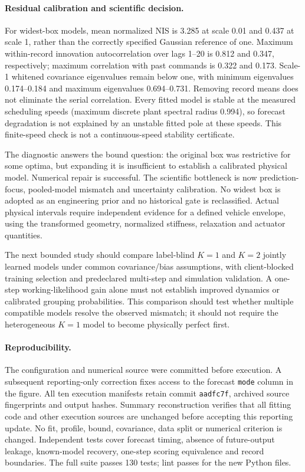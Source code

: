 \paragraph{Residual calibration and scientific decision.}
For widest-box models, mean normalized NIS is 3.285 at scale 0.01 and 0.437
at scale 1, rather than the correctly specified Gaussian reference of one.
Maximum within-record innovation autocorrelation over lags 1--20 is 0.812
and 0.347, respectively; maximum correlation with past commands is 0.322 and
0.173. Scale-1 whitened covariance eigenvalues remain below one, with minimum
eigenvalues 0.174--0.184 and maximum eigenvalues 0.694--0.731. Removing record
means does not eliminate the serial correlation. Every fitted model is stable
at the measured scheduling speeds (maximum discrete plant spectral radius
0.994), so forecast degradation is not explained by an unstable fitted pole
at these speeds. This finite-speed check is not a continuous-speed stability
certificate.

The diagnostic answers the bound question: the original box was restrictive
for some optima, but expanding it is insufficient to establish a calibrated
physical model. Numerical repair is successful. The scientific bottleneck
is now prediction-focus, pooled-model mismatch and uncertainty calibration.
No widest box is adopted as an engineering prior and no historical gate is
reclassified. Actual physical intervals require independent evidence for a
defined vehicle envelope, using the transformed geometry, normalized
stiffness, relaxation and actuator quantities.

The next bounded study should compare label-blind $K=1$ and $K=2$ jointly
learned models under common covariance/bias assumptions, with client-blocked
training selection and predeclared multi-step and simulation validation.
A one-step working-likelihood gain alone must not establish improved dynamics
or calibrated grouping probabilities. This comparison should test whether
multiple compatible models resolve the observed mismatch; it should not
require the heterogeneous $K=1$ model to become physically perfect first.

\paragraph{Reproducibility.}
The configuration and numerical source were committed before execution.
A subsequent reporting-only correction fixes access to the forecast
\texttt{mode} column in the figure. All ten execution manifests retain
commit \texttt{aadfc7f}, archived source fingerprints and output hashes.
Summary reconstruction verifies that all fitting code and other execution
sources are unchanged before accepting this reporting update. No fit,
profile, bound, covariance, data split or numerical criterion is changed.
Independent tests cover forecast timing, absence of future-output leakage,
known-model recovery, one-step scoring equivalence and record boundaries.
The full suite passes 130 tests; lint passes for the new Python files.
